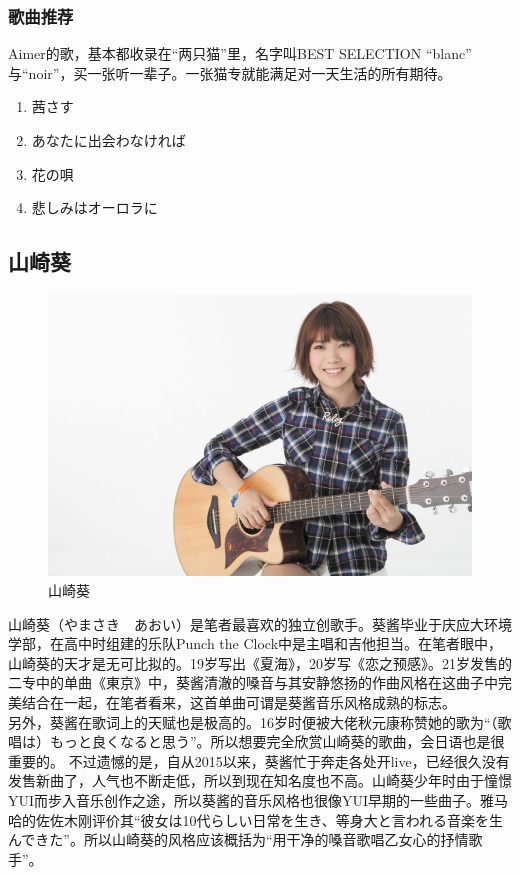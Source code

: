 \documentclass{ctexart}
\begin{document}
\subsubsection*{歌曲推荐}
Aimer的歌，基本都收录在“两只猫”里，名字叫BEST SELECTION “blanc” 与“noir”，买一张听一辈子。一张猫专就能满足对一天生活的所有期待。
\begin{enumerate}
\item 茜さす
\item あなたに出会わなければ
\item 花の唄
\item 悲しみはオーロラに
\end{enumerate}

\subsection{山崎葵}

\begin{figure}[h]
\centering
 \includegraphics[width=1\textwidth]{yamasaki_aoi.jpg}
 \caption{山崎葵}
\end{figure}

山崎葵（やまさき　あおい）是笔者最喜欢的独立创歌手。葵酱毕业于庆应大环境学部，在高中时组建的乐队Punch the Clock中是主唱和吉他担当。在笔者眼中，山崎葵的天才是无可比拟的。19岁写出《夏海》，20岁写《恋之预感》。21岁发售的二专中的单曲《東京》中，葵酱清澈的嗓音与其安静悠扬的作曲风格在这曲子中完美结合在一起，在笔者看来，这首单曲可谓是葵酱音乐风格成熟的标志。\\
另外，葵酱在歌词上的天赋也是极高的。16岁时便被大佬秋元康称赞她的歌为“（歌唱は）もっと良くなると思う”。所以想要完全欣赏山崎葵的歌曲，会日语也是很重要的。
不过遗憾的是，自从2015以来，葵酱忙于奔走各处开live，已经很久没有发售新曲了，人气也不断走低，所以到现在知名度也不高。山崎葵少年时由于憧憬YUI而步入音乐创作之途，所以葵酱的音乐风格也很像YUI早期的一些曲子。雅马哈的佐佐木刚评价其“彼女は10代らしい日常を生き、等身大と言われる音楽を生んできた”。所以山崎葵的风格应该概括为“用干净的嗓音歌唱乙女心的抒情歌手”。
\end{document}
